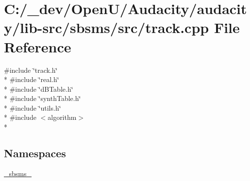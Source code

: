 \hypertarget{lib-src_2sbsms_2src_2track_8cpp}{}\section{C\+:/\+\_\+dev/\+Open\+U/\+Audacity/audacity/lib-\/src/sbsms/src/track.cpp File Reference}
\label{lib-src_2sbsms_2src_2track_8cpp}
{\ttfamily \#include \char`\"{}track.\+h\char`\"{}}\\*
{\ttfamily \#include \char`\"{}real.\+h\char`\"{}}\\*
{\ttfamily \#include \char`\"{}d\+B\+Table.\+h\char`\"{}}\\*
{\ttfamily \#include \char`\"{}synth\+Table.\+h\char`\"{}}\\*
{\ttfamily \#include \char`\"{}utils.\+h\char`\"{}}\\*
{\ttfamily \#include $<$algorithm$>$}\\*
\subsection*{Namespaces}
\begin{DoxyCompactItemize}
\item 
 \hyperlink{namespace__sbsms__}{\+\_\+sbsms\+\_\+}
\end{DoxyCompactItemize}
